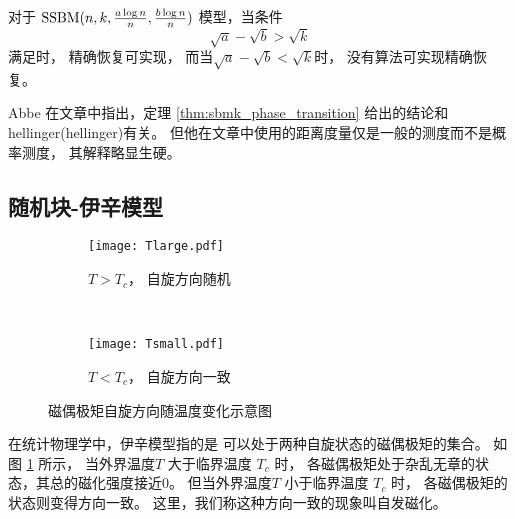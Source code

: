 \begin{theorem}\label{thm:sbmk_phase_transition}
  对于 $\operatorname{SSBM}(n,k,\frac{a \log n}{n}, \frac{b \log n}{n})$ 模型，当条件
  \begin{equation}\label{eq:abk}
    \sqrt{a} - \sqrt{b} > \sqrt{k}
  \end{equation}   
  满足时，
  精确恢复可实现，
  而当$\sqrt{a} - \sqrt{b} < \sqrt{k}$时，
  没有算法可实现精确恢复。
\end{theorem}
\begin{remark}
  Abbe 在文章中指出，定理 \ref{thm:sbmk_phase_transition} 
  给出的结论和\gls{hellinger}(\glsdesc{hellinger})有关。
  但他在文章中使用的距离度量仅是一般的测度而不是概率测度，
  其解释略显生硬。
\end{remark}

\subsection{随机块-伊辛模型}\label{sec:ising}
\begin{figure}
	\centering
	\begin{subfigure}{0.5\textwidth}
    \centering
    \texttt{[image: Tlarge.pdf]}
		\caption{$T>T_c$， 自旋方向随机}
	\end{subfigure}~
	\begin{subfigure}{0.5\textwidth}
    \centering
    \texttt{[image: Tsmall.pdf]}
		\caption{$T<T_c$， 自旋方向一致}
	\end{subfigure}
  \caption{磁偶极矩自旋方向随温度变化示意图}\label{fig:ising_two_configurations}
\end{figure}   

在统计物理学中，伊辛模型指的是
可以处于两种自旋状态的磁偶极矩的集合\cite{ising1925beitrag}。
如图 \ref{fig:ising_two_configurations} 所示，
当外界温度$T$
大于临界温度 $T_c$ 时，
各磁偶极矩处于杂乱无章的状态，其总的磁化强度接近0。
但当外界温度$T$
小于临界温度 $T_c$ 时，
各磁偶极矩的状态则变得方向一致。
这里，我们称这种方向一致的现象叫自发磁化。


